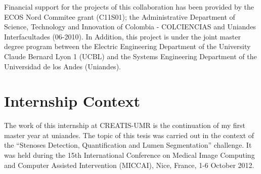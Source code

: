 Financial support for the projects of this collaboration has been provided by the ECOS Nord Commitee grant (C11S01); the Administrative Department of Science, Technology and Innovation of Colombia - COLCIENCIAS and Uniandes Interfacultades (06-2010). In Addition, this project is under the joint master degree program between the Electric Engineering Department of the University Claude Bernard Lyon 1 (UCBL) and the Systems Engineering Department of the Universidad de los Andes (Uniandes). 

\section{Internship Context}
The work of this internship at CREATIS-UMR is the continuation of my first master year at uniandes. The topic of this tesis was carried out in the context of the ``Stenoses Detection, Quantification and Lumen Segmentation'' challenge. It was held during the 15th International Conference on Medical Image Computing and Computer Assisted Intervention (MICCAI), Nice, France, 1-6 October 2012.
